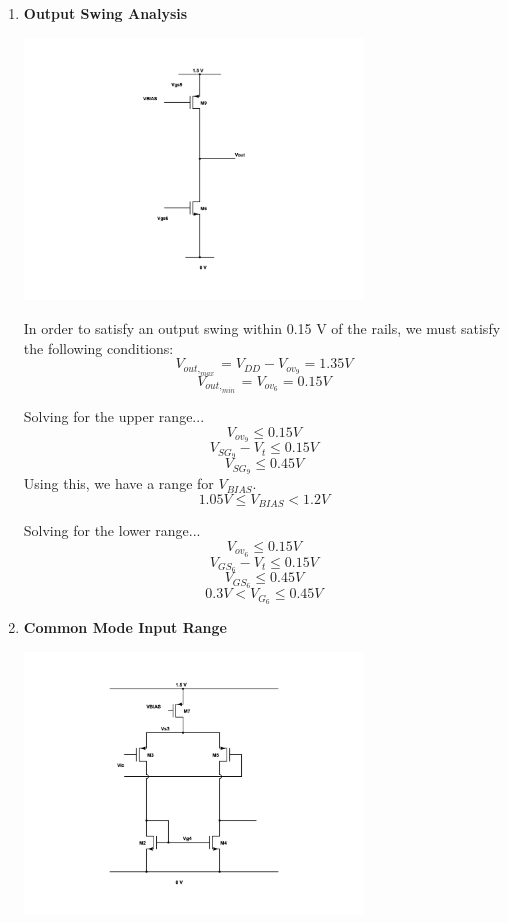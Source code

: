 \documentclass[]{article}
\begin{document}
	\pagebreak

	\begin{enumerate}
	
	\item %
		{\bf Output Swing Analysis}
		\begin{center}
		\includegraphics[width=90mm]{cmos-swing-analysis-second-stage.png}
		\end{center}

		{In order to satisfy an output swing within 0.15 V of the rails, we must satisfy the following conditions: }
		\newline
		\newline
		$$ V_{out, _{max}}  = V_{DD} - V_{ov_{9}} = 1.35 V $$
		$$ V_{out, _{min}}  =  V_{ov_{6}} = 0.15 V$$

		Solving for the upper range...
		$$V_{ov_{9}} \le 0.15 V $$
		$$V_{SG_{9}} - V_{t} \le 0.15 V $$
		$$ V_{SG_{9}} \le 0.45V $$
		Using this, we have a range for $V_{BIAS}$.
		$$ 1.05 V\le V_{BIAS}  < 1.2V $$

		Solving for the lower range...
		$$V_{ov_{6}} \le 0.15 V $$
		$$V_{GS_{6}} - V_{t} \le 0.15 V $$
		$$ V_{GS_{6}} \le 0.45V $$
		$$ 0.3 V< V_{G_{6}}  \le 0.45V $$
		\newline
		
		\pagebreak

	\item %
		{\bf Common Mode Input Range}
		\newline
		\begin{center}
		\includegraphics[width = 90mm]{common-mode-input-range-analysis.png}
		\end{center}


\end{enumerate}
\end{document}
